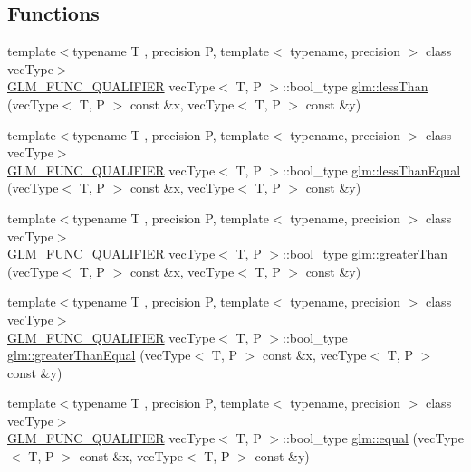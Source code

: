 \subsection*{Functions}
\begin{DoxyCompactItemize}
\item 
{\footnotesize template$<$typename T , precision P, template$<$ typename, precision $>$ class vec\+Type$>$ }\\\hyperlink{setup_8hpp_a33fdea6f91c5f834105f7415e2a64407}{G\+L\+M\+\_\+\+F\+U\+N\+C\+\_\+\+Q\+U\+A\+L\+I\+F\+I\+ER} vec\+Type$<$ T, P $>$\+::bool\+\_\+type \hyperlink{namespaceglm_a9ea052832f152d1233c6fa27df62f2fc}{glm\+::less\+Than} (vec\+Type$<$ T, P $>$ const \&x, vec\+Type$<$ T, P $>$ const \&y)
\item 
{\footnotesize template$<$typename T , precision P, template$<$ typename, precision $>$ class vec\+Type$>$ }\\\hyperlink{setup_8hpp_a33fdea6f91c5f834105f7415e2a64407}{G\+L\+M\+\_\+\+F\+U\+N\+C\+\_\+\+Q\+U\+A\+L\+I\+F\+I\+ER} vec\+Type$<$ T, P $>$\+::bool\+\_\+type \hyperlink{group__core__func__vector__relational_ga2167b22ac086c5791a4740932b62b685}{glm\+::less\+Than\+Equal} (vec\+Type$<$ T, P $>$ const \&x, vec\+Type$<$ T, P $>$ const \&y)
\item 
{\footnotesize template$<$typename T , precision P, template$<$ typename, precision $>$ class vec\+Type$>$ }\\\hyperlink{setup_8hpp_a33fdea6f91c5f834105f7415e2a64407}{G\+L\+M\+\_\+\+F\+U\+N\+C\+\_\+\+Q\+U\+A\+L\+I\+F\+I\+ER} vec\+Type$<$ T, P $>$\+::bool\+\_\+type \hyperlink{group__core__func__vector__relational_gac9163d451231eb3eaae2c6b3da5add6a}{glm\+::greater\+Than} (vec\+Type$<$ T, P $>$ const \&x, vec\+Type$<$ T, P $>$ const \&y)
\item 
{\footnotesize template$<$typename T , precision P, template$<$ typename, precision $>$ class vec\+Type$>$ }\\\hyperlink{setup_8hpp_a33fdea6f91c5f834105f7415e2a64407}{G\+L\+M\+\_\+\+F\+U\+N\+C\+\_\+\+Q\+U\+A\+L\+I\+F\+I\+ER} vec\+Type$<$ T, P $>$\+::bool\+\_\+type \hyperlink{group__core__func__vector__relational_gad1385064aa2fc7aaae37aa95daea9c31}{glm\+::greater\+Than\+Equal} (vec\+Type$<$ T, P $>$ const \&x, vec\+Type$<$ T, P $>$ const \&y)
\item 
{\footnotesize template$<$typename T , precision P, template$<$ typename, precision $>$ class vec\+Type$>$ }\\\hyperlink{setup_8hpp_a33fdea6f91c5f834105f7415e2a64407}{G\+L\+M\+\_\+\+F\+U\+N\+C\+\_\+\+Q\+U\+A\+L\+I\+F\+I\+ER} vec\+Type$<$ T, P $>$\+::bool\+\_\+type \hyperlink{namespaceglm_a4a4eb228ace536873b64b9690d14e971}{glm\+::equal} (vec\+Type$<$ T, P $>$ const \&x, vec\+Type$<$ T, P $>$ const \&y)

\end{DoxyCompactItemize}
